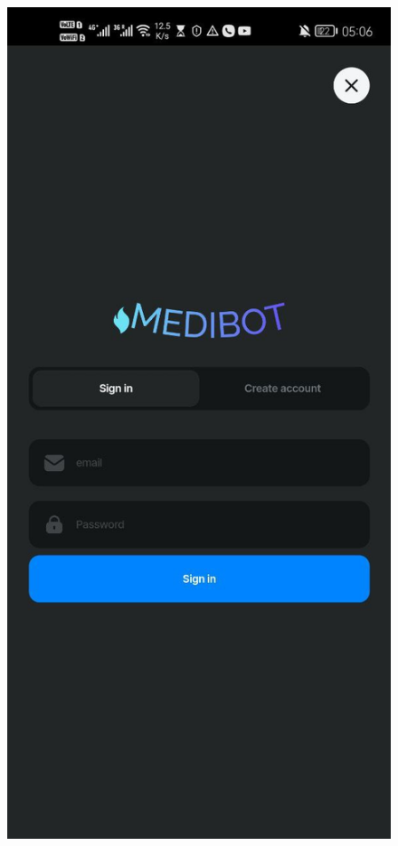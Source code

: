 \begin{figure}[htbp]
    \centering
    \begin{minipage}{0.3\textwidth}
        \centering
        \includegraphics[width=\textwidth]{./Figures/mobile-login.jpg}

\end{minipage}
\end{figure}
